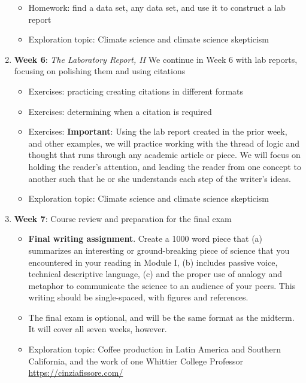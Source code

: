 \documentclass[10pt]{article}
\begin{document}
\begin{enumerate}
\begin{itemize}
\item Homework: find a data set, any data set, and use it to construct a lab report
\item Exploration topic: Climate science and climate science skepticism
\end{itemize}
\item \textbf{Week 6}: \textit{The Laboratory Report, II} We continue in Week 6 with lab reports, focusing on polishing them and using citations
\begin{itemize}
\item Exercises: practicing creating citations in different formats
\item Exercises: determining when a citation is required
\item Exercises: \textbf{Important}: Using the lab report created in the prior week, and other examples, we will practice working with the thread of logic and thought that runs through any academic article or piece.  We will focus on holding the reader's attention, and leading the reader from one concept to another such that he or she understands each step of the writer's ideas.
\item Exploration topic: Climate science and climate science skepticism
\end{itemize}
\item \textbf{Week 7}: Course review and preparation for the final exam
\begin{itemize}
\item \textbf{Final writing assignment}.  Create a 1000 word piece that (a) summarizes an interesting or ground-breaking piece of science that you encountered in your reading in Module I, (b) includes passive voice, technical descriptive language, (c) and the proper use of analogy and metaphor to communicate the science to an audience of your peers.  This writing should be single-spaced, with figures and references.
\item The final exam is optional, and will be the same format as the midterm.  It will cover all seven weeks, however.
\item Exploration topic: Coffee production in Latin America and Southern California, and the work of one Whittier College Professor \url{https://cinziafissore.com/}
\end{itemize}
\end{enumerate}
\end{document}
